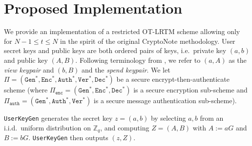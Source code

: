 \documentclass{mrl}
\theoremstyle{definition}
\begin{document}
\section{Proposed Implementation}\label{sec:implement}

We provide an implementation of a restricted OT-LRTM scheme allowing only for $N-1 \leq t \leq N$ in the spirit of the original CryptoNote methodology. User secret keys and public keys are both ordered pairs of keys, i.e.\ private key $(a,b)$ and public key $(A,B)$. Following terminology from \cite{van2013cryptonote}, we refer to $(a,A)$ as the \textit{view keypair} and $(b,B)$ and the \textit{spend keypair}.  We let $\Pi = (\texttt{Gen}^*,\texttt{Enc}^*, \texttt{Auth}^*, \texttt{Ver}^*, \texttt{Dec}^*)$ be a secure encrypt-then-authenticate scheme (where $\Pi_{\texttt{enc}} = (\texttt{Gen}^*,\texttt{Enc}^*, \texttt{Dec}^*)$ is a secure encryption sub-scheme and $\Pi_{\texttt{auth}} = (\texttt{Gen}^*,\texttt{Auth}^*, \texttt{Ver}^*)$ is a secure message authentication sub-scheme). %

\texttt{UserKeyGen} generates the secret key $z=(a,b)$ by selecting $a,b$ from an i.i.d.\ uniform distribution on $\mathbb{Z}_q$, and computing $Z=(A,B)$ with $A:=aG$ and $B:=bG$. \texttt{UserKeyGen} then outputs $(z,Z)$.
\end{document}
